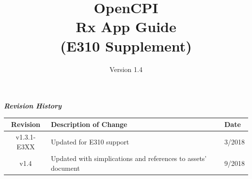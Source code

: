 \def\docTitle{OpenCPI\\ Rx App Guide\\ (E310 Supplement)}
\def\docVersion{1.4}

\date{Version \docVersion} %
\title{\docTitle}
\usepackage{graphicx}
\graphicspath{ {figures/} }
\usepackage{textcomp}


\maketitle
\newpage
	\begin{center}
	\textit{\textbf{Revision History}}
		\begin{table}[H]
		\label{table:revisions} %
			\begin{tabularx}{\textwidth}{|c|X|l|}
			\hline
			\rowcolor{blue}
			\textbf{Revision} & \textbf{Description of Change} & \textbf{Date} \\
			\hline
			v1.3.1-E3XX & Updated for E310 support & 3/2018 \\
			\hline
			v1.4 & Updated with simplications and references to assets' document & 9/2018 \\
			\hline
			\end{tabularx}
		\end{table}
	\end{center}

